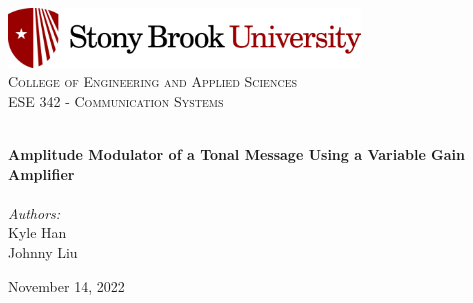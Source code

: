 
\begin{titlepage}
\vbox{ }
\vbox{ }
\begin{center}
\includegraphics[width=0.70\textwidth]{Images/stony-brook-university-logo-horizontal-300-1024x173.png}\\[1cm]
\textsc{\LARGE College of Engineering and Applied Sciences}\\[1.5cm]
\textsc{\Large ESE 342 - Communication Systems}\\[0.5cm]
\vbox{ }

\HRule \\[0.4cm]
{ \huge \bfseries Amplitude Modulator of a Tonal Message Using a Variable Gain Amplifier}\\[0.4cm]
\HRule \\[1.5cm]

\large
\emph{Authors:}\\
Kyle Han \\
Johnny Liu
\vfill

{\large November 14, 2022}
\end{center}
\end{titlepage}
